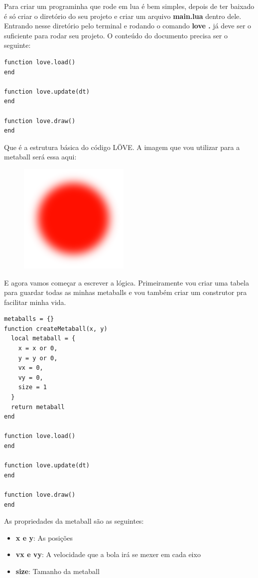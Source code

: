 \documentclass[a4paper,oneside,12pt]{article}
\begin{document}
Para criar um programinha que rode em lua é bem simples, depois de ter baixado é só criar o diretório do seu projeto e criar um arquivo \textbf{main.lua} dentro dele. Entrando nesse diretório pelo terminal e rodando o comando \textbf{love .} já deve ser o suficiente para rodar seu projeto. O conteúdo do documento precisa ser o seguinte:

\begin{lstlisting}[language={[5.2]Lua}]
function love.load()
end

function love.update(dt)
end

function love.draw()
end
\end{lstlisting}

Que é a estrutura básica do código LÖVE. A imagem que vou utilizar para a metaball será essa aqui:

\begin{figure}[h]
    \centering
    \includegraphics[width=.2\linewidth]{media/metaball.png}
\end{figure}

E agora vamos começar a escrever a lógica. Primeiramente vou criar uma tabela para guardar todas as minhas metaballs e vou também criar um construtor pra facilitar minha vida.

\begin{lstlisting}[language={[5.2]Lua}]
metaballs = {}
function createMetaball(x, y)
  local metaball = {
    x = x or 0,
    y = y or 0,
    vx = 0,
    vy = 0,
    size = 1
  }
  return metaball
end

function love.load()
end

function love.update(dt)
end

function love.draw()
end
\end{lstlisting}

As propriedades da metaball são as seguintes:

\begin{itemize}
    \item \textbf{x e y}: As posições
    \item \textbf{vx e vy}: A velocidade que a bola irá se mexer em cada eixo
    \item \textbf{size}: Tamanho da metaball
\end{itemize}
\end{document}
